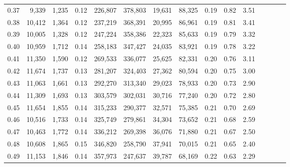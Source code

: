 \begin{tabular}{rrrcrrrrrrrrrrr}
0.37 &   9,339 &  1,235 &                                       0.12 &  226,807 &  378,803 &   19,631 &   88,325 &  0.19 &  0.82 &                         3.51 \\
0.38 &  10,412 &  1,364 &                                       0.12 &  237,219 &  368,391 &   20,995 &   86,961 &  0.19 &  0.81 &                         3.41 \\
0.39 &  10,005 &  1,328 &                                       0.12 &  247,224 &  358,386 &   22,323 &   85,633 &  0.19 &  0.79 &                         3.32 \\
0.40 &  10,959 &  1,712 &                                       0.14 &  258,183 &  347,427 &   24,035 &   83,921 &  0.19 &  0.78 &                         3.22 \\
0.41 &  11,350 &  1,590 &                                       0.12 &  269,533 &  336,077 &   25,625 &   82,331 &  0.20 &  0.76 &                         3.11 \\
0.42 &  11,674 &  1,737 &                                       0.13 &  281,207 &  324,403 &   27,362 &   80,594 &  0.20 &  0.75 &                         3.00 \\
0.43 &  11,063 &  1,661 &                                       0.13 &  292,270 &  313,340 &   29,023 &   78,933 &  0.20 &  0.73 &                         2.90 \\
0.44 &  11,309 &  1,693 &                                       0.13 &  303,579 &  302,031 &   30,716 &   77,240 &  0.20 &  0.72 &                         2.80 \\
0.45 &  11,654 &  1,855 &                                       0.14 &  315,233 &  290,377 &   32,571 &   75,385 &  0.21 &  0.70 &                         2.69 \\
0.46 &  10,516 &  1,733 &                                       0.14 &  325,749 &  279,861 &   34,304 &   73,652 &  0.21 &  0.68 &                         2.59 \\
0.47 &  10,463 &  1,772 &                                       0.14 &  336,212 &  269,398 &   36,076 &   71,880 &  0.21 &  0.67 &                         2.50 \\
0.48 &  10,608 &  1,865 &                                       0.15 &  346,820 &  258,790 &   37,941 &   70,015 &  0.21 &  0.65 &                         2.40 \\
0.49 &  11,153 &  1,846 &                                       0.14 &  357,973 &  247,637 &   39,787 &   68,169 &  0.22 &  0.63 &                         2.29 \\

\end{tabular}
